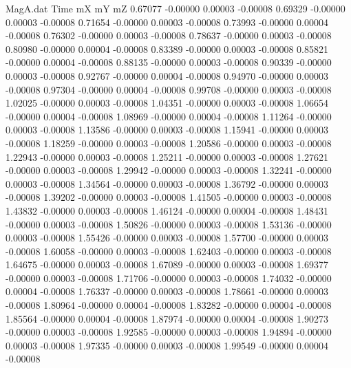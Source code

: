 \begin{filecontents}{MagA.dat}
Time mX mY mZ
   0.67077   -0.00000    0.00003   -0.00008
   0.69329   -0.00000    0.00003   -0.00008
   0.71654   -0.00000    0.00003   -0.00008
   0.73993   -0.00000    0.00004   -0.00008
   0.76302   -0.00000    0.00003   -0.00008
   0.78637   -0.00000    0.00003   -0.00008
   0.80980   -0.00000    0.00004   -0.00008
   0.83389   -0.00000    0.00003   -0.00008
   0.85821   -0.00000    0.00004   -0.00008
   0.88135   -0.00000    0.00003   -0.00008
   0.90339   -0.00000    0.00003   -0.00008
   0.92767   -0.00000    0.00004   -0.00008
   0.94970   -0.00000    0.00003   -0.00008
   0.97304   -0.00000    0.00004   -0.00008
   0.99708   -0.00000    0.00003   -0.00008
   1.02025   -0.00000    0.00003   -0.00008
   1.04351   -0.00000    0.00003   -0.00008
   1.06654   -0.00000    0.00004   -0.00008
   1.08969   -0.00000    0.00004   -0.00008
   1.11264   -0.00000    0.00003   -0.00008
   1.13586   -0.00000    0.00003   -0.00008
   1.15941   -0.00000    0.00003   -0.00008
   1.18259   -0.00000    0.00003   -0.00008
   1.20586   -0.00000    0.00003   -0.00008
   1.22943   -0.00000    0.00003   -0.00008
   1.25211   -0.00000    0.00003   -0.00008
   1.27621   -0.00000    0.00003   -0.00008
   1.29942   -0.00000    0.00003   -0.00008
   1.32241   -0.00000    0.00003   -0.00008
   1.34564   -0.00000    0.00003   -0.00008
   1.36792   -0.00000    0.00003   -0.00008
   1.39202   -0.00000    0.00003   -0.00008
   1.41505   -0.00000    0.00003   -0.00008
   1.43832   -0.00000    0.00003   -0.00008
   1.46124   -0.00000    0.00004   -0.00008
   1.48431   -0.00000    0.00003   -0.00008
   1.50826   -0.00000    0.00003   -0.00008
   1.53136   -0.00000    0.00003   -0.00008
   1.55426   -0.00000    0.00003   -0.00008
   1.57700   -0.00000    0.00003   -0.00008
   1.60058   -0.00000    0.00003   -0.00008
   1.62403   -0.00000    0.00003   -0.00008
   1.64675   -0.00000    0.00003   -0.00008
   1.67089   -0.00000    0.00003   -0.00008
   1.69377   -0.00000    0.00003   -0.00008
   1.71706   -0.00000    0.00003   -0.00008
   1.74032   -0.00000    0.00004   -0.00008
   1.76337   -0.00000    0.00003   -0.00008
   1.78661   -0.00000    0.00003   -0.00008
   1.80964   -0.00000    0.00004   -0.00008
   1.83282   -0.00000    0.00004   -0.00008
   1.85564   -0.00000    0.00004   -0.00008
   1.87974   -0.00000    0.00004   -0.00008
   1.90273   -0.00000    0.00003   -0.00008
   1.92585   -0.00000    0.00003   -0.00008
   1.94894   -0.00000    0.00003   -0.00008
   1.97335   -0.00000    0.00003   -0.00008
   1.99549   -0.00000    0.00004   -0.00008

\end{filecontents}
